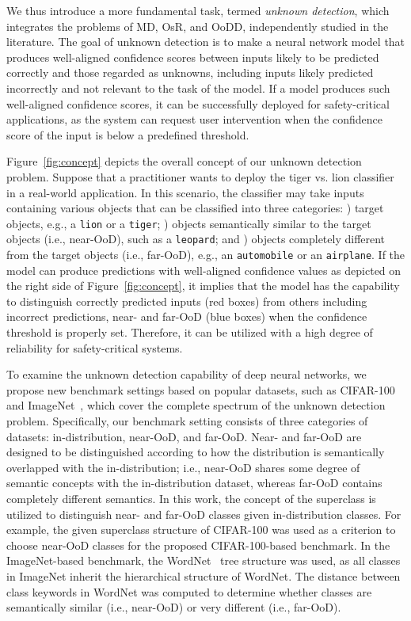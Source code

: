\documentclass[preprint,12pt]{elsarticle}
\begin{document}
We thus introduce a more fundamental task, termed \emph{unknown detection}, which integrates the problems of MD, OsR, and OoDD, independently studied in the literature. The goal of unknown detection is to make a neural network model that produces well-aligned confidence scores between inputs likely to be predicted correctly and those regarded as unknowns, including inputs likely predicted incorrectly and not relevant to the task of the model. If a model produces such well-aligned confidence scores, it can be successfully deployed for safety-critical applications, as the system can request user intervention when the confidence score of the input is below a predefined threshold.

Figure~\ref{fig:concept} depicts the overall concept of our unknown detection problem. Suppose that a practitioner wants to deploy the tiger vs. lion classifier in a real-world application. In this scenario, the classifier may take inputs containing various objects that can be classified into three categories:  ) target objects, e.g., a \texttt{lion} or a \texttt{tiger};  ) objects semantically similar to the target objects (i.e., near-OoD), such as a \texttt{leopard}; and  ) objects completely different from the target objects (i.e., far-OoD), e.g., an \texttt{automobile} or an \texttt{airplane}. If the model can produce predictions with well-aligned confidence values as depicted on the right side of Figure~\ref{fig:concept}, it implies that the model has the capability to distinguish correctly predicted inputs (red boxes) from others including incorrect predictions, near- and far-OoD (blue boxes) when the confidence threshold is properly set. Therefore, it can be utilized with a high degree of reliability for safety-critical systems.

To examine the unknown detection capability of deep neural networks, we propose new benchmark settings based on popular datasets, such as CIFAR-100 and ImageNet~\citep{deng2009imagenet}, which cover the complete spectrum of the unknown detection problem. Specifically, our benchmark setting consists of three categories of datasets: in-distribution, near-OoD, and far-OoD. Near- and far-OoD are designed to be distinguished according to how the distribution is semantically overlapped with the in-distribution; i.e., near-OoD shares some degree of semantic concepts with the in-distribution dataset, whereas far-OoD contains completely different semantics. In this work, the concept of the superclass is utilized to distinguish near- and far-OoD classes given in-distribution classes. For example, the given superclass structure of CIFAR-100 was used as a criterion to choose near-OoD classes for the proposed CIFAR-100-based benchmark. In the ImageNet-based benchmark, the WordNet~\citep{miller1995wordnet} tree structure was used, as all classes in ImageNet inherit the hierarchical structure of WordNet. The distance between class keywords in WordNet was computed to determine whether classes are semantically similar (i.e., near-OoD) or very different (i.e., far-OoD).
\end{document}
